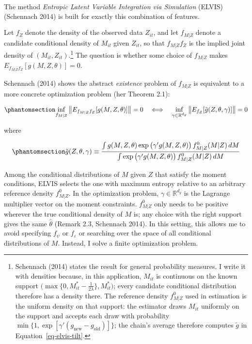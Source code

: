 \documentclass[
  12pt,
  letterpaper,
  oneside,
  openany]{report}
\begin{document}
The method \emph{Entropic Latent Variable Integration via Simulation}
(ELVIS) (Schennach 2014) is built for exactly this combination of
features.

Let \(f_Z\) denote the density of the observed data \(Z_{it}\), and let
\(f_{M|Z}\) denote a candidate conditional density of \(M_{it}\) given
\(Z_{it}\), so that \(f_{M|Z}f_Z\) is the implied joint density of
\((M_{it},Z_{it})\).\footnote{Schennach (2014) states the result for
  general probability measures. I write it with densities because, in
  this application, \(M_{it}\) is continuous on the known support
  \(\big(\max\{0,M^*_{it}-\tfrac{1}{2\lambda}\},M^*_{it}\big)\); every
  candidate conditional distribution therefore has a density there. The
  reference density \(f^0_{M|Z}\) used in estimation is the uniform
  density on that support: the estimator draws \(M_{it}\) uniformly on
  the support and accepts each draw with probability
  \(\min\{1,\exp[\gamma'(g_{\text{new}}-g_{\text{old}})]\}\); the
  chain's average therefore computes \(\tilde g\) in
  Equation~\ref{eq-elvis-tilt}.} The question is whether some choice of
\(f_{M|Z}\) makes \(E_{f_{M|Z}f_Z}[g(M,Z,\theta)]=0\).

Schennach (2014) shows the abstract \emph{existence} problem of
\(f_{M|Z}\) is equivalent to a more concrete optimization problem (her
Theorem 2.1):

\begin{equation}\protect\phantomsection\label{eq-elvis-equiv}{
\inf_{f_{M|Z}}\big\|E_{f_{M|Z}f_Z}[g(M,Z,\theta)]\big\|=0 \quad\Longleftrightarrow\quad \inf_{\gamma\in\mathbb R^{d_g}}\big\|E_{f_Z}[\tilde g(Z,\theta,\gamma)]\big\|=0
}\end{equation}

where

\begin{equation}\protect\phantomsection\label{eq-elvis-tilt}{
\tilde g(Z,\theta,\gamma)\equiv\frac{\int g(M,Z,\theta)\exp\big(\gamma'g(M,Z,\theta)\big)\,f^0_{M|Z}(M|Z)\,dM}{\int \exp\big(\gamma'g(M,Z,\theta)\big)\,f^0_{M|Z}(M|Z)\,dM}
}\end{equation}

Among the conditional distributions of \(M\) given \(Z\) that satisfy
the moment conditions, ELVIS selects the one with maximum entropy
relative to an arbitrary reference density \(f^0_{M|Z}\). In the
optimization problem, \(\gamma\in\mathbb{R}^{d_g}\) is the Lagrange
multiplier vector on the moment constraints. \(f^0_{M|Z}\) only needs to
be positive wherever the true conditional density of \(M\) is; any
choice with the right support gives the same \(\hat\theta\) (Remark 2.3,
Schennach 2014). In this setting, this allows me to avoid specifying
\(f_\psi\) or \(f_\varepsilon\) or searching over the space of all
conditional distributions of \(M\). Instead, I solve a finite
optimization problem.
\end{document}
